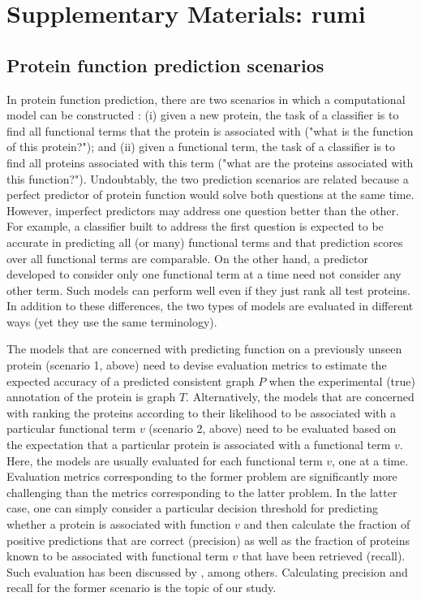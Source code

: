 \chapter{Supplementary Materials: rumi} 


\section{Protein function prediction scenarios}

In protein function prediction, there are two scenarios in which a computational model can be constructed \citep{Radivojac2013}: (i) given a new protein, the task of a classifier is to find all functional terms that the protein is associated with ("what is the function of this protein?"); and (ii) given a functional term, the task of a classifier is to find all proteins associated with this term ("what are the proteins associated with this function?"). Undoubtably, the two prediction scenarios are related because a perfect predictor of protein function would solve both questions at the same time. However, imperfect predictors may address one question better than the other. For example, a classifier built to address the first question is expected to be accurate in predicting all (or many) functional terms and that prediction scores over all functional terms are comparable. On the other hand, a predictor developed to consider only one functional term at a time need not consider any other term. Such models can perform well even if they just rank all test proteins. In addition to these differences, the two types of models are evaluated in different ways (yet they use the same terminology).

The models that are concerned with predicting function on a previously unseen protein (scenario 1, above) need to devise evaluation metrics to estimate the expected accuracy of a predicted consistent graph $P$ when the experimental (true) annotation of the protein is graph $T$. Alternatively, the models that are concerned with ranking the proteins according to their likelihood to be associated with a particular functional term $v$ (scenario 2, above) need to be evaluated based on the expectation that a particular protein is associated with a functional term $v$. Here, the models are usually evaluated for each functional term $v$, one at a time. Evaluation metrics corresponding to the former problem are significantly more challenging than the metrics corresponding to the latter problem. In the latter case, one can simply consider a particular decision threshold for predicting whether a protein is associated with function $v$ and then calculate the fraction of positive predictions that are correct (precision) as well as the fraction of proteins known to be associated with functional term $v$ that have been retrieved (recall). Such evaluation has been discussed by \citet{Sharan2007}, among others. Calculating precision and recall for the former scenario is the topic of our study.


